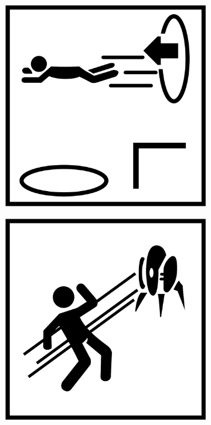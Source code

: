 \begin{figure}[H]
  \begin{subfigure}[l]{0.195\linewidth}
    \includegraphics[width=\textwidth]{Sources/PortalIcons/6.jpg}
  \end{subfigure}
  \begin{subfigure}[l]{0.195\linewidth}
    \includegraphics[width=\textwidth]{Sources/PortalIcons/7.jpg}

\end{subfigure}
\end{figure}
